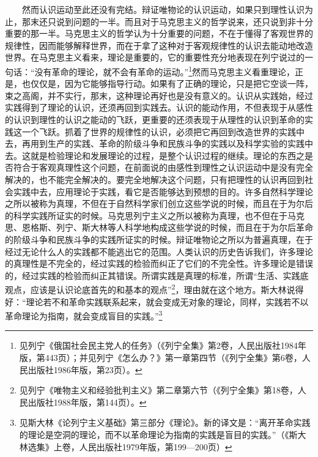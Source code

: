 \documentclass[cn,11pt,chinese]{elegantbook}
\begin{document}
　　然而认识运动至此还没有完结。辩证唯物论的认识运动，如果只到理性认识为止，那末还只说到问题的一半。而且对于马克思主义的哲学说来，还只说到非十分重要的那一半。马克思主义的哲学认为十分重要的问题，不在于懂得了客观世界的规律性，因而能够解释世界，而在于拿了这种对于客观规律性的认识去能动地改造世界。在马克思主义看来，理论是重要的，它的重要性充分地表现在列宁说过的一句话：“没有革命的理论，就不会有革命的运动。”\footnote[8]{ 见列宁《俄国社会民主党人的任务》（《列宁全集》第2卷，人民出版社1984年版，第443页）；并见列宁《怎么办？》第一章第四节（《列宁全集》第6卷，人民出版社1986年版，第23页）。}然而马克思主义看重理论，正是，也仅仅是，因为它能够指导行动。如果有了正确的理论，只是把它空谈一阵，束之高阁，并不实行，那末，这种理论再好也是没有意义的。认识从实践始，经过实践得到了理论的认识，还须再回到实践去。认识的能动作用，不但表现于从感性的认识到理性的认识之能动的飞跃，更重要的还须表现于从理性的认识到革命的实践这一个飞跃。抓着了世界的规律性的认识，必须把它再回到改造世界的实践中去，再用到生产的实践、革命的阶级斗争和民族斗争的实践以及科学实验的实践中去。这就是检验理论和发展理论的过程，是整个认识过程的继续。理论的东西之是否符合于客观真理性这个问题，在前面说的由感性到理性之认识运动中是没有完全解决的，也不能完全解决的。要完全地解决这个问题，只有把理性的认识再回到社会实践中去，应用理论于实践，看它是否能够达到预想的目的。许多自然科学理论之所以被称为真理，不但在于自然科学家们创立这些学说的时候，而且在于为尔后的科学实践所证实的时候。马克思列宁主义之所以被称为真理，也不但在于马克思、恩格斯、列宁、斯大林等人科学地构成这些学说的时候，而且在于为尔后革命的阶级斗争和民族斗争的实践所证实的时候。辩证唯物论之所以为普遍真理，在于经过无论什么人的实践都不能逃出它的范围。人类认识的历史告诉我们，许多理论的真理性是不完全的，经过实践的检验而纠正了它们的不完全性。许多理论是错误的，经过实践的检验而纠正其错误。所谓实践是真理的标准，所谓“生活、实践底观点，应该是认识论底首先的和基本的观点”\footnote[9]{ 见列宁《唯物主义和经验批判主义》第二章第六节（《列宁全集》第18卷，人民出版社1988年版，第144页）。}，理由就在这个地方。斯大林说得好：“理论若不和革命实践联系起来，就会变成无对象的理论，同样，实践若不以革命理论为指南，就会变成盲目的实践。”\footnote[10]{ 见斯大林《论列宁主义基础》第三部分《理论》。新的译文是：“离开革命实践的理论是空洞的理论，而不以革命理论为指南的实践是盲目的实践。”（《斯大林选集》上卷，人民出版社1979年版，第199—200页）}\\
\end{document}
